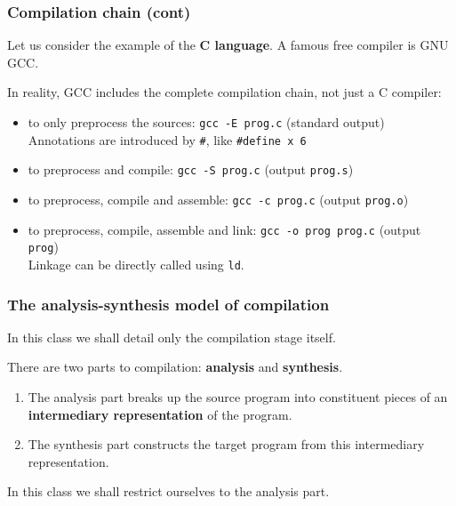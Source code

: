 % 
\begin{frame}[containsverbatim]
\frametitle{Compilation chain (cont)}

Let us consider the example of the \textbf{C language}. A famous free
compiler is GNU GCC.

\bigskip

In reality, GCC includes the complete compilation chain, not just a C
compiler:
\begin{itemize}

  \item to only preprocess the sources: \verb+gcc -E prog.c+
  (standard output)\\ 
  Annotations are introduced by \verb+#+, like \verb+#define x 6+

  \item to preprocess and compile: \verb+gcc -S prog.c+ (output
  \verb+prog.s+)

  \item to preprocess, compile and assemble: \verb+gcc -c prog.c+
  (output \verb+prog.o+)

  \item to preprocess, compile, assemble and link:
  \verb+gcc -o prog prog.c+ (output \verb+prog+)\\
  Linkage can  be directly called using \verb+ld+.

\end{itemize}

\end{frame}

% 
\begin{frame}
\frametitle{The analysis-synthesis model of compilation}

In this class we shall detail only the compilation stage itself.

\bigskip

There are two parts to compilation: \textbf{analysis} and
\textbf{synthesis}.
\begin{enumerate}
 
  \item The analysis part breaks up the source program into
  constituent pieces of an \textbf{intermediary representation} of the
  program.

  \item The synthesis part constructs the target program from this
  intermediary representation.

\end{enumerate}
In this class we shall restrict ourselves to the analysis part.

\end{frame}

